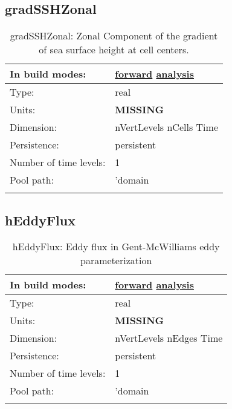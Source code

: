\subsection[gradSSHZonal]{gradSSHZonal}
\label{subsec:var_sec_diagnostics_gradSSHZonal}
\begin{center}
\begin{longtable}{| p{2.0in} | p{4.0in} |}
        \hline 
        In build modes: & \hyperref[subsec:forward_var_tab_diagnostics]{forward} \hyperref[subsec:analysis_var_tab_diagnostics]{analysis} \\
        \hline 
        Type: & real \\
        \hline 
        Units: & {\bf \color{red} MISSING} \\
        \hline 
        Dimension: & nVertLevels nCells Time \\
        \hline 
        Persistence: & persistent \\
        \hline 
        Number of time levels: & 1 \\
        \hline 
            Pool path: & 'domain %
 \\
		 \hline 
    \caption{gradSSHZonal: Zonal Component of the gradient of sea surface height at cell centers.}
\end{longtable}
\end{center}
\subsection[hEddyFlux]{hEddyFlux}
\label{subsec:var_sec_diagnostics_hEddyFlux}
\begin{center}
\begin{longtable}{| p{2.0in} | p{4.0in} |}
        \hline 
        In build modes: & \hyperref[subsec:forward_var_tab_diagnostics]{forward} \hyperref[subsec:analysis_var_tab_diagnostics]{analysis} \\
        \hline 
        Type: & real \\
        \hline 
        Units: & {\bf \color{red} MISSING} \\
        \hline 
        Dimension: & nVertLevels nEdges Time \\
        \hline 
        Persistence: & persistent \\
        \hline 
        Number of time levels: & 1 \\
        \hline 
            Pool path: & 'domain %
 \\
		 \hline 
    \caption{hEddyFlux: Eddy flux in Gent-McWilliams eddy parameterization}
\end{longtable}
\end{center}
